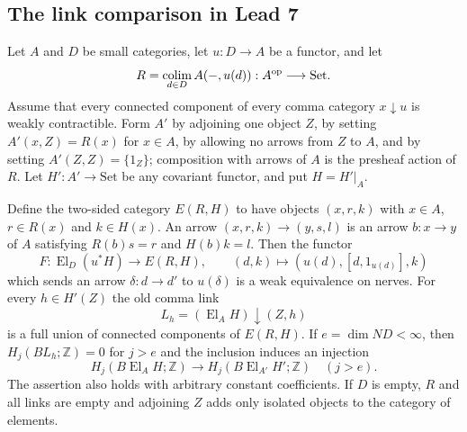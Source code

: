 \subsection{The link comparison in Lead 7}

\begin{proposition}\label{C:link-comparison}
Let $A$ and $D$ be small categories, let $u:D\to A$ be a functor, and let
\[
 R=\mathop{\rm colim}_{d\in D}A(-,u(d)):A^{\rm op}\longrightarrow\mathrm{Set}.
\]
Assume that every connected component of every comma category $x\downarrow u$
is weakly contractible. Form $A'$ by adjoining one object $Z$, by setting
$A'(x,Z)=R(x)$ for $x\in A$, by allowing no arrows from $Z$ to $A$, and by
setting $A'(Z,Z)=\{1_Z\}$; composition with arrows of $A$ is the presheaf
action of $R$. Let $H':A'\to\mathrm{Set}$ be any covariant functor, and put
$H=H'|_A$.

Define the two-sided category $E(R,H)$ to have objects $(x,r,k)$ with
$x\in A$, $r\in R(x)$ and $k\in H(x)$. An arrow
$(x,r,k)\to(y,s,l)$ is an arrow $b:x\to y$ of $A$ satisfying
$R(b)s=r$ and $H(b)k=l$. Then the functor
\[
 F:\operatorname{El}_D(u^*H)\longrightarrow E(R,H),\qquad
 (d,k)\longmapsto(u(d),[d,1_{u(d)}],k)
\]
which sends an arrow $\delta:d\to d'$ to $u(\delta)$ is a weak equivalence
on nerves. For every $h\in H'(Z)$ the old comma link
\[
 L_h=(\operatorname{El}_A H)\downarrow (Z,h)
\]
is a full union of connected components of $E(R,H)$. If
$e=\dim ND<\infty$, then $H_j(BL_h;\mathbb Z)=0$ for $j>e$ and the
inclusion induces an injection
\[
 H_j(B\operatorname{El}_A H;\mathbb Z)\longrightarrow
 H_j(B\operatorname{El}_{A'}H';\mathbb Z)
 \quad(j>e).
\]
The assertion also holds with arbitrary constant coefficients. If $D$ is
empty, $R$ and all links are empty and adjoining $Z$ adds only isolated
objects to the category of elements.
\end{proposition}

